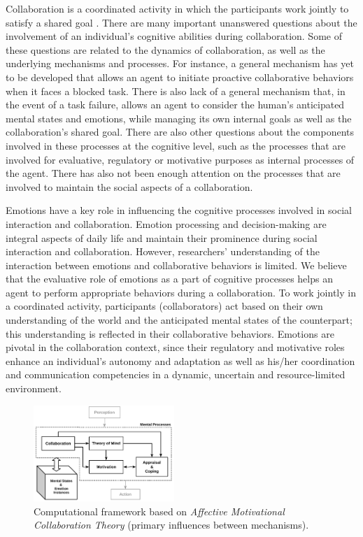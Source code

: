\documentclass[letterpaper]{article}
\begin{document}
Collaboration is a coordinated activity in which the participants work jointly
to satisfy a shared goal \cite{grosz:plans-discourse}. There are many important
unanswered questions about the involvement of an individual's cognitive
abilities during collaboration. Some of these questions are related to the
dynamics of collaboration, as well as the underlying mechanisms and processes.
For instance, a general mechanism has yet to be developed that allows an agent
to initiate proactive collaborative behaviors when it faces a blocked task.
There is also lack of a general mechanism that, in the event of a task failure,
allows an agent to consider the human's anticipated mental states and emotions,
while managing its own internal goals as well as the collaboration's shared
goal. There are also other questions about the components involved in these
processes at the cognitive level, such as the processes that are involved for
evaluative, regulatory or motivative purposes as internal processes of the
agent. There has also not been enough attention on the processes that are
involved to maintain the social aspects of a collaboration.

Emotions have a key role in influencing the cognitive processes involved in
social interaction and collaboration. Emotion processing and decision-making are
integral aspects of daily life and maintain their prominence during social
interaction and collaboration. However, researchers' understanding of the
interaction between emotions and collaborative behaviors is limited. We believe
that the evaluative role of emotions as a part of cognitive processes helps an
agent to perform appropriate behaviors during a collaboration. To work jointly
in a coordinated activity, participants (collaborators) act based on their own
understanding of the world and the anticipated mental states of the counterpart;
this understanding is reflected in their collaborative behaviors. Emotions are
pivotal in the collaboration context, since their regulatory and motivative
roles enhance an individual's autonomy and adaptation as well as his/her
coordination and communication competencies in a dynamic, uncertain and
resource-limited environment.

\begin{figure}[tbh]
  \centering
  \includegraphics[width=0.474\textwidth]{figure/theory-general-croped.pdf}
  \caption{Computational framework based on \textit{Affective Motivational
  Collaboration Theory} (primary influences between mechanisms).}
  \label{fig:cpm}
\end{figure}
\end{document}
